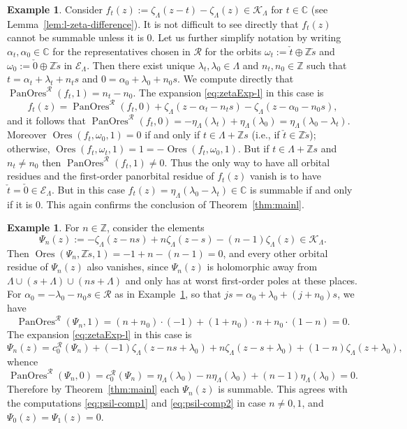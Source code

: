 \documentclass[preprint,12pt]{elsarticle}
\numberwithin{equation}{section} %
\theoremstyle{theorem}
\theoremstyle{definition}
\newtheorem{example}[theorem]{Example}
\newcommand{\bk}{\mathcal{K}} %
\newcommand{\bkl}{\bk_{\Lambda}} %
\newcommand{\ec}{\mathcal{E}} %
\newcommand{\ecl}{\ec_{\Lambda}} %
\newcommand{\C}{\mathbb{C}} %
\newcommand{\Z}{\mathbb{Z}} %
\newcommand{\zl}{\zeta_{\Lambda}}
\DeclareMathOperator{\ores}{Ores}
\DeclareMathOperator{\pano}{PanOres}
\begin{document}
 \begin{example}\label{ex:zeta-difference-l}Consider $f_t(z):=\zl(z-t)-\zl(z)\in\bkl$ for $t\in\C$ (see Lemma~\ref{lem:l-zeta-difference}). It is not difficult to see directly that $f_t(z)$ cannot be summable unless it is $0$. Let us further simplify notation by writing $\alpha_t,\alpha_0\in\C$ for the representatives chosen in $\mathcal{R}$ for the orbits $\omega_t:=\check{t}\oplus\Z\check{s}$ and $\omega_0:=\check{0}\oplus\Z \check{s}$ in $\ecl$. Then there exist unique $\lambda_t,\lambda_0\in\Lambda$ and $n_t,n_0\in\Z$ such that $t=\alpha_t+\lambda_t+n_ts$ and $0=\alpha_0+\lambda_0+n_0s$. We compute directly that $\pano^\mathcal{R}(f_t,1)=n_t-n_0$. The expansion \eqref{eq:zetaExp-l} in this case is \[f_t(z)=\pano^\mathcal{R}(f_t,0)+\zl(z-\alpha_t-n_ts)-\zl(z-\alpha_0-n_0s),\] and it follows that $\pano^\mathcal{R}(f_t,0)=-\eta_\Lambda(\lambda_t)+\eta_\Lambda(\lambda_0)=\eta_\Lambda(\lambda_0-\lambda_t)$. Moreover $\ores(f_t,\omega_0,1)=0$ if and only if $t\in\Lambda+\Z s$ (i.e., if $\check{t}\in\Z\check{s}$); otherwise, $\ores(f_t,\omega_t,1)=1=-\ores(f_t,\omega_0,1)$. But if $t\in\Lambda+\Z s$ and $n_t\neq n_0$ then $\pano^\mathcal{R}(f_t,1)\neq 0$. Thus the only way to have all orbital residues and the first-order panorbital residue of $f_t(z)$ vanish is to have $\check{t}=\check{0}\in\ecl$. But in this case $f_t(z)=\eta_\Lambda(\lambda_0-\lambda_t)\in\C$ is summable if and only if it is $0$. This again confirms the conclusion of Theorem~\ref{thm:mainl}.\end{example}

\begin{example} \label{ex:psi-sum-l}For $n\in\Z$, consider the elements
    \[\Psi_n(z):=-\zl(z-ns)+n\zl(z-s)-(n-1)\zl(z)\in\bkl.\] Then $\ores(\Psi_n,\Z\check{s},1)=-1+n-(n-1)=0$, and every other orbital residue of $\Psi_n(z)$ also vanishes, since $\Psi_n(z)$ is holomorphic away from $\Lambda\cup (s+\Lambda)\cup (ns+\Lambda)$ and only has at worst first-order poles at these places. For $\alpha_0=-\lambda_0-n_0s\in\mathcal{R}$ as in Example~\ref{ex:zeta-difference-l}, so that $js=\alpha_0+\lambda_0+(j+n_0)s$, we have \[
    \pano^\mathcal{R}(\Psi_n,1)=(n+n_0)\cdot(-1)+(1+n_0)\cdot n+n_0\cdot(1-n)=0.\] The expansion \eqref{eq:zetaExp-l} in this case is \[\Psi_n(z)=c^\mathcal{R}_0(\Psi_n)+(-1)\zl(z-ns+\lambda_0)+n\zl(z-s+\lambda_0)+(1-n)\zl(z+\lambda_0),\] whence \[\pano^\mathcal{R}(\Psi_n,0)=c_0^\mathcal{R}(\Psi_n)=\eta_\Lambda(\lambda_0)-n\eta_\Lambda(\lambda_0)+(n-1)\eta_\Lambda(\lambda_0)=0.\] Therefore by Theorem~\ref{thm:mainl} each $\Psi_n(z)$ is summable. This agrees with the computations \eqref{eq:psil-comp1} and \eqref{eq:psil-comp2} in case $n\neq0,1$, and $\Psi_0(z)=\Psi_1(z)=0$.
\end{example}
\end{document}
